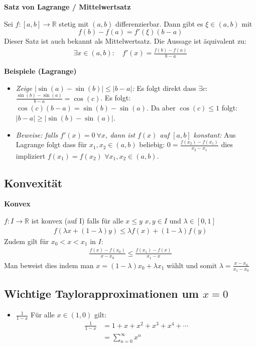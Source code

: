 \documentclass[25pt]{sciposter}
\newcommand{\R}{\mathbb{R}}
\newenvironment{method}[1]{\begin{mdframed}[backgroundcolor=blue!10,innertopmargin=15pt, innerbottommargin=15pt,nobreak=true]
		\textbf{#1 }
	}
	{ 
	\end{mdframed}
}
\begin{document}
\begin{multicols}{3}
\begin{method}{Satz von Lagrange / Mittelwertsatz}
	Sei $f:[a,b] \to \R$ stetig mit $(a,b)$ differenzierbar. Dann gibt es $\xi \in (a,b)$ mit $$f(b) - f(a) = f'(\xi) (b-a)$$
	Dieser Satz ist auch bekannt als Mittelwertsatz. Die Aussage ist äquivalent zu: 
	\begin{align*}
		\exists x \in (a,b) : \quad f'(x) = \frac{f(b) -f(a) }{b-a}
	\end{align*}
\end{method}
\textbf{Beispiele (Lagrange)}
\begin{itemize}
	\item \textit{Zeige $|\sin(a) - \sin(b)| \leq |b-a|$:} Es folgt direkt dass $\exists c$: $\frac{\sin(b)- \sin(a)}{b-a} = \cos(c)$. Es folgt: $\cos(c) (b-a) = \sin(b) - \sin(a)$. Da aber $\cos(c) \leq 1$ folgt:
	$|b-a| \geq |\sin(b) - \sin(a)|$.
	\item \textit{Beweise: falls $f'(x) = 0 \ \forall x$, dann ist $f(x)$ auf $[a,b]$ konstant:} Aus Lagrange folgt dass für $x_1,x_2\in (a,b)$ beliebig: $0 = \frac{f(x_2)-f(x_1)}{x_2-x_1}$ dies impliziert $f(x_1) = f(x_2)$ $\forall x_1,x_2 \in (a,b)$.
\end{itemize}

\subsection*{Konvexität}

\begin{method}{Konvex}
	$f : I \to \R$ ist konvex (auf I) falls für alle $x \leq y$ $x,y \in I$ und $\lambda \in [0,1]$
	\begin{align*}
	f(\lambda x + (1-\lambda)y) \leq \lambda f(x) + (1-\lambda)f(y)
	\end{align*}
	Zudem gilt für $x_0 < x< x_1$ in $I$:
	\begin{align*}
	 \frac{f(x) - f(x_0)}{x-x_0} \leq \frac{f(x_1) - f(x)}{x_1 - x}
	\end{align*}
	Man beweist dies indem man $x = (1-\lambda) x_0 + \lambda x_1$ wählt und somit $\lambda = \frac{x-x_0}{x_1 - x_0}$
\end{method}




\subsection*{Wichtige Taylorapproximationen um $x=0$}
\begin{itemize}
	\item $\boxed{\frac{1}{1-x}}$ Für alle $x \in (1,0)$ gilt:
	\begin{align*}
	{\frac{1}{1-x}} &= 1 + x + x^2 + x^3 + x^4 + \cdots \\
	&= \sum_{n=0}^{\infty} x^n
	\end{align*}	
	

\end{itemize}
\end{multicols}
\end{document}
